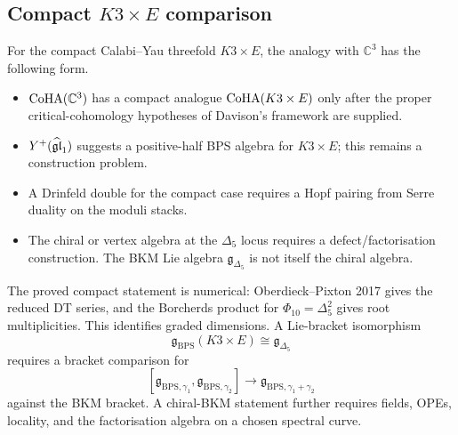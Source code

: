 \subsection{Compact $K3\times E$ comparison}

For the compact Calabi--Yau threefold $K3\times E$, the analogy with
$\mathbb C^3$ has the following form.
\begin{itemize}
\item $\mathrm{CoHA}(\mathbb C^3)$ has a compact analogue
    $\mathrm{CoHA}(K3\times E)$ only after the proper critical-cohomology
    hypotheses of Davison's framework are supplied.
\item $Y^+(\widehat{\mathfrak{gl}}_1)$ suggests a positive-half BPS algebra for
    $K3\times E$; this remains a construction problem.
\item A Drinfeld double for the compact case requires a Hopf pairing
    from Serre duality on the moduli stacks.
\item The chiral or vertex algebra at the $\Delta_5$ locus requires a
    defect/factorisation construction. The BKM Lie algebra
    $\mathfrak g_{\Delta_5}$ is not itself the chiral algebra.
\end{itemize}

The proved compact statement is numerical: Oberdieck--Pixton 2017 gives
the reduced DT series, and the Borcherds product for
$\Phi_{10}=\Delta_5^2$ gives root multiplicities. This identifies
graded dimensions. A Lie-bracket isomorphism
\[
\mathfrak g_{\mathrm{BPS}}(K3\times E)\cong\mathfrak g_{\Delta_5}
\]
requires a bracket comparison for
\[
[\mathfrak g_{\mathrm{BPS},\gamma_1},
 \mathfrak g_{\mathrm{BPS},\gamma_2}]
\to
\mathfrak g_{\mathrm{BPS},\gamma_1+\gamma_2}
\]
against the BKM bracket. A chiral-BKM statement further requires
fields, OPEs, locality, and the factorisation algebra on a chosen
spectral curve.
